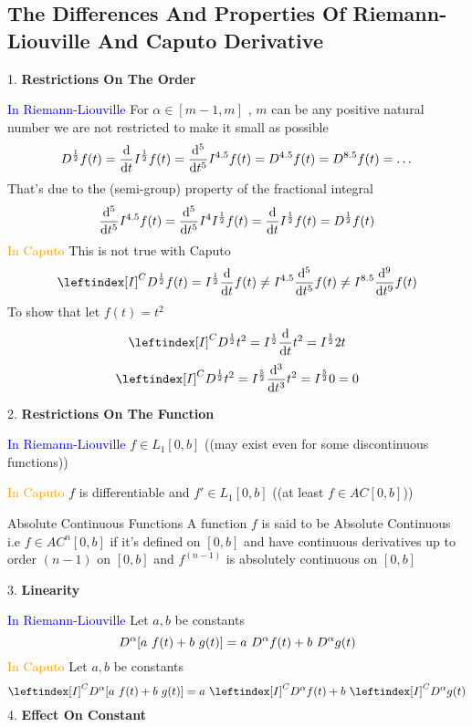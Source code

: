 \subsection{The Differences And Properties Of Riemann-Liouville And Caputo Derivative}
\textcolor{theme}{1.}\textbf{ Restrictions On The Order}

\textcolor{blue}{In Riemann-Liouville} For $\alpha \in [m-1,m]$ , $m$ can be any positive natural number we are not restricted to make it small as possible
\[
    D^{\frac{1}{2}} f(t) = \dv{}{t} I^{\frac{1}{2}} f(t) = \dv[5]{}{t} I^{4.5} f(t) =  D^{4.5} f(t) = D^{8.5} f(t) = \dots
\]
That's due to the (semi-group) property of the fractional integral
\[
            \dv[5]{}{t} I^{4.5} f(t)= \dv[5]{}{t} I^{4}I^{\frac{1}{2}} f(t)= \dv{}{t} I^{\frac{1}{2}} f(t) = D^{\frac{1}{2}} f(t) 
\]
\textcolor{orange}{In Caputo} This is not true with Caputo 
\[
    \leftindex[I]^C {D^{\frac{1}{2}}} f(t) =  I^{\frac{1}{2}} \dv{}{t} f(t) \neq I^{4.5} \dv[5]{}{t} f(t) \neq I^{8.5} \dv[9]{}{t} f(t)
\]
To show that let $f(t) = t^2$
\[
    \leftindex[I]^C {D^{\frac{1}{2}}} t^2 = I^{\frac{1}{2}} \dv{}{t} t^2 = I^{\frac{1}{2}} 2t
\]
\[
    \leftindex[I]^C {D^{\frac{1}{2}}} t^2 = I^{\frac{5}{2}} \dv[3]{}{t} t^2 = I^{\frac{5}{2}} 0 = 0
\]

\textcolor{theme}{2.}\textbf{ Restrictions On The Function}

\textcolor{blue}{In Riemann-Liouville} $f \in L_1[0,b]$ ((may exist even for some discontinuous functions))

\textcolor{orange}{In Caputo} $f$ is differentiable and $f' \in L_1[0,b]$ ((at least $f \in AC[0,b]$))
\begin{enrichment*}{Absolute Continuous Functions}
    A function $f$ is said to be Absolute Continuous i.e $f \in AC^{n}[0,b]$ if it's defined on $[0,b]$ and have continuous derivatives up to order $(n-1)$ on $[0, b]$
    and $f^{(n-1)}$ is absolutely continuous on $[0,b]$
\end{enrichment*}



\textcolor{theme}{3.}\textbf{ Linearity}

\textcolor{blue}{In Riemann-Liouville} Let $a,b$ be constants
\[
    D^{\alpha} [a \,\, f(t) + b \,\, g(t)] =  a \,\, D^{\alpha}f(t) + b \,\, D^{\alpha}g(t)
\]
\textcolor{orange}{In Caputo} Let $a,b$ be constants
\[
    \leftindex[I]^C {D^{\alpha}} [a \hquad f(t) + b \hquad g(t)] =  a \hquad \leftindex[I]^C {D^{\alpha}} f(t) + b \hquad\leftindex[I]^C {D^{\alpha}} g(t)
\]
\textcolor{theme}{4.}\textbf{ Effect On Constant}

